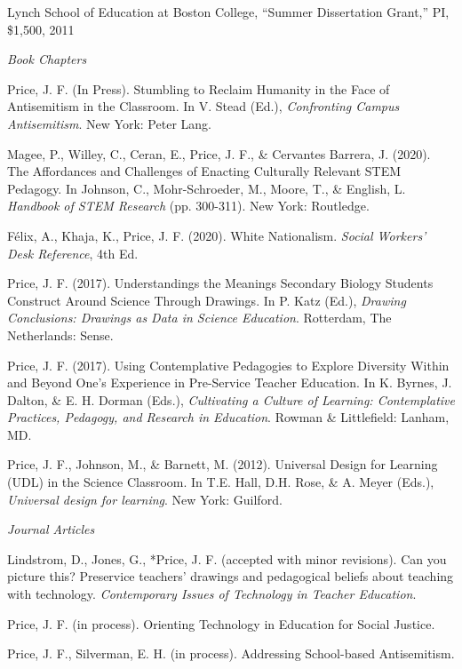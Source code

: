 \documentclass[11pt,article,oneside]{memoir}
\begin{document}
      \ind Lynch School of Education at Boston College, ``Summer Dissertation Grant,'' PI, \$1,500, 2011
\bigskip


\medskip
\noindent\emph{Book Chapters \vspace{0.01in}}

\ind Price, J. F. (In Press). Stumbling to Reclaim Humanity in the Face of Antisemitism in the Classroom. In V. Stead (Ed.), \textit{Confronting Campus Antisemitism}. New York: Peter Lang.

\ind Magee, P., Willey, C., Ceran, E., Price, J. F., \& Cervantes Barrera, J. (2020). The Affordances and Challenges of Enacting Culturally Relevant STEM Pedagogy. In Johnson, C., Mohr-Schroeder, M., Moore, T., \& English, L. \textit{Handbook of STEM Research} (pp. 300-311). New York: Routledge.

\ind Félix, A., Khaja, K., Price, J. F. (2020). White Nationalism. \textit{Social Workers' Desk Reference}, 4th Ed.

\ind Price, J. F. (2017). Understandings the Meanings Secondary Biology Students Construct Around Science Through Drawings. In P. Katz (Ed.), \textit{Drawing Conclusions: Drawings as Data in Science Education}. Rotterdam, The Netherlands: Sense.

\ind Price, J. F. (2017). Using Contemplative Pedagogies to Explore Diversity Within and Beyond One’s Experience in Pre-Service Teacher Education. In K. Byrnes, J. Dalton, \& E. H. Dorman (Eds.), \textit{Cultivating a Culture of Learning: Contemplative Practices, Pedagogy, and Research in Education}. Rowman \& Littlefield: Lanham, MD.

\ind Price, J. F., Johnson, M., \& Barnett, M. (2012). Universal Design for Learning (UDL) in the Science Classroom. In T.E. Hall, D.H. Rose, \& A. Meyer (Eds.), \textit{Universal design for learning}. New York: Guilford.

\bigskip
\noindent\emph{Journal Articles \vspace{0.05in}}

\ind Lindstrom, D., Jones, G., *Price, J. F. (accepted with minor revisions). Can you picture this? Preservice teachers’ drawings and pedagogical beliefs about teaching with technology. \textit{Contemporary Issues of Technology in Teacher Education}.

\ind Price, J. F. (in process). Orienting Technology in Education for Social Justice.

\ind Price, J. F., Silverman, E. H. (in process). Addressing School-based Antisemitism.
\end{document}
